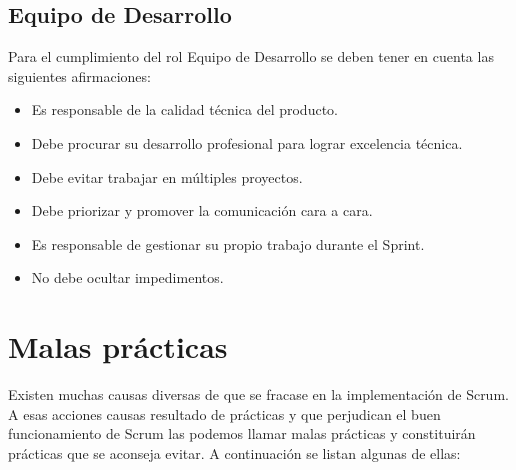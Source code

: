 \subsection{Equipo de Desarrollo}

Para el cumplimiento del rol Equipo de Desarrollo se deben tener en cuenta las siguientes afirmaciones:

\begin{itemize}
\item Es responsable de la calidad técnica del producto.
\item Debe procurar su desarrollo profesional para lograr excelencia técnica.
\item Debe evitar trabajar en múltiples proyectos.
\item Debe priorizar y promover la comunicación cara a cara.
\item Es responsable de gestionar su propio trabajo durante el Sprint.
\item No debe ocultar impedimentos.
\end{itemize}



\section{Malas prácticas}

Existen muchas causas diversas de que se fracase en la implementación de Scrum. A esas acciones causas resultado de prácticas y que perjudican el buen funcionamiento de Scrum las podemos llamar malas prácticas y constituirán prácticas que se aconseja evitar.
A continuación se listan algunas de ellas:

